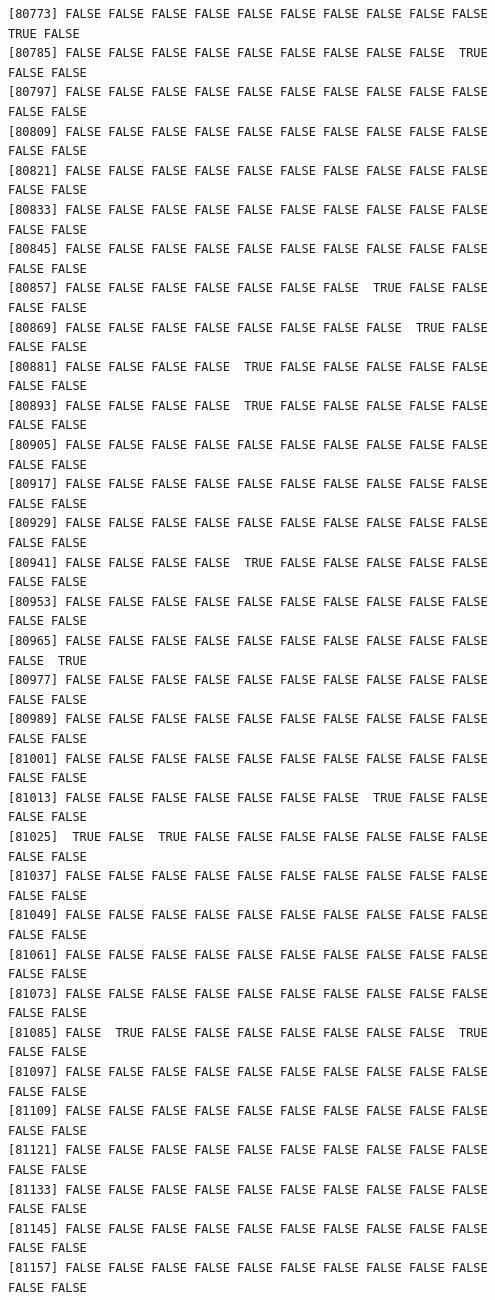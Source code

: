 \documentclass[
  a4paper,
  DIV=11,
  numbers=noendperiod]{scrartcl}
\begin{document}
\begin{verbatim}
[80773] FALSE FALSE FALSE FALSE FALSE FALSE FALSE FALSE FALSE FALSE  TRUE FALSE
[80785] FALSE FALSE FALSE FALSE FALSE FALSE FALSE FALSE FALSE  TRUE FALSE FALSE
[80797] FALSE FALSE FALSE FALSE FALSE FALSE FALSE FALSE FALSE FALSE FALSE FALSE
[80809] FALSE FALSE FALSE FALSE FALSE FALSE FALSE FALSE FALSE FALSE FALSE FALSE
[80821] FALSE FALSE FALSE FALSE FALSE FALSE FALSE FALSE FALSE FALSE FALSE FALSE
[80833] FALSE FALSE FALSE FALSE FALSE FALSE FALSE FALSE FALSE FALSE FALSE FALSE
[80845] FALSE FALSE FALSE FALSE FALSE FALSE FALSE FALSE FALSE FALSE FALSE FALSE
[80857] FALSE FALSE FALSE FALSE FALSE FALSE FALSE  TRUE FALSE FALSE FALSE FALSE
[80869] FALSE FALSE FALSE FALSE FALSE FALSE FALSE FALSE  TRUE FALSE FALSE FALSE
[80881] FALSE FALSE FALSE FALSE  TRUE FALSE FALSE FALSE FALSE FALSE FALSE FALSE
[80893] FALSE FALSE FALSE FALSE  TRUE FALSE FALSE FALSE FALSE FALSE FALSE FALSE
[80905] FALSE FALSE FALSE FALSE FALSE FALSE FALSE FALSE FALSE FALSE FALSE FALSE
[80917] FALSE FALSE FALSE FALSE FALSE FALSE FALSE FALSE FALSE FALSE FALSE FALSE
[80929] FALSE FALSE FALSE FALSE FALSE FALSE FALSE FALSE FALSE FALSE FALSE FALSE
[80941] FALSE FALSE FALSE FALSE  TRUE FALSE FALSE FALSE FALSE FALSE FALSE FALSE
[80953] FALSE FALSE FALSE FALSE FALSE FALSE FALSE FALSE FALSE FALSE FALSE FALSE
[80965] FALSE FALSE FALSE FALSE FALSE FALSE FALSE FALSE FALSE FALSE FALSE  TRUE
[80977] FALSE FALSE FALSE FALSE FALSE FALSE FALSE FALSE FALSE FALSE FALSE FALSE
[80989] FALSE FALSE FALSE FALSE FALSE FALSE FALSE FALSE FALSE FALSE FALSE FALSE
[81001] FALSE FALSE FALSE FALSE FALSE FALSE FALSE FALSE FALSE FALSE FALSE FALSE
[81013] FALSE FALSE FALSE FALSE FALSE FALSE FALSE  TRUE FALSE FALSE FALSE FALSE
[81025]  TRUE FALSE  TRUE FALSE FALSE FALSE FALSE FALSE FALSE FALSE FALSE FALSE
[81037] FALSE FALSE FALSE FALSE FALSE FALSE FALSE FALSE FALSE FALSE FALSE FALSE
[81049] FALSE FALSE FALSE FALSE FALSE FALSE FALSE FALSE FALSE FALSE FALSE FALSE
[81061] FALSE FALSE FALSE FALSE FALSE FALSE FALSE FALSE FALSE FALSE FALSE FALSE
[81073] FALSE FALSE FALSE FALSE FALSE FALSE FALSE FALSE FALSE FALSE FALSE FALSE
[81085] FALSE  TRUE FALSE FALSE FALSE FALSE FALSE FALSE FALSE  TRUE FALSE FALSE
[81097] FALSE FALSE FALSE FALSE FALSE FALSE FALSE FALSE FALSE FALSE FALSE FALSE
[81109] FALSE FALSE FALSE FALSE FALSE FALSE FALSE FALSE FALSE FALSE FALSE FALSE
[81121] FALSE FALSE FALSE FALSE FALSE FALSE FALSE FALSE FALSE FALSE FALSE FALSE
[81133] FALSE FALSE FALSE FALSE FALSE FALSE FALSE FALSE FALSE FALSE FALSE FALSE
[81145] FALSE FALSE FALSE FALSE FALSE FALSE FALSE FALSE FALSE FALSE FALSE FALSE
[81157] FALSE FALSE FALSE FALSE FALSE FALSE FALSE FALSE FALSE FALSE FALSE FALSE

\end{verbatim}
\end{document}
